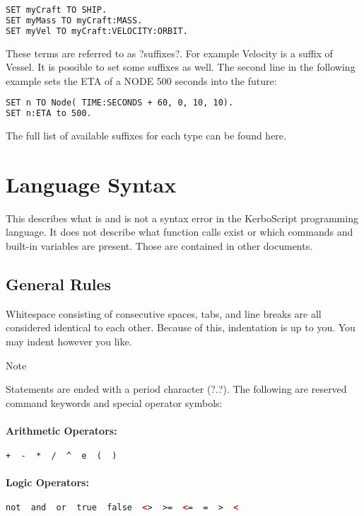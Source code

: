 \begin{lstlisting}[frame=single,language=XML]
SET myCraft TO SHIP.
SET myMass TO myCraft:MASS.
SET myVel TO myCraft:VELOCITY:ORBIT.
\end{lstlisting}

These terms are referred to as ?suffixes?. For example Velocity is a suffix of Vessel. It is possible to set some suffixes as well. The second line in the following example sets the ETA of a NODE 500 seconds into the future:

\begin{lstlisting}[frame=single,language=XML]
SET n TO Node( TIME:SECONDS + 60, 0, 10, 10).
SET n:ETA to 500.
\end{lstlisting}

The full list of available suffixes for each type can be found here.
	\section{Language Syntax}%
	This describes what is and is not a syntax error in the KerboScript programming language. It does not describe what function calls exist or which commands and built-in variables are present. Those are contained in other documents.
	\subsection{General Rules}
Whitespace consisting of consecutive spaces, tabs, and line breaks are all considered identical to each other. Because of this, indentation is up to you. You may indent however you like.

Note

Statements are ended with a period character (?.?).
The following are reserved command keywords and special operator symbols:

\paragraph{Arithmetic Operators:}

\begin{lstlisting}[frame=single,language=XML]
+  -  *  /  ^  e  (  )
\end{lstlisting}

\paragraph{Logic Operators:}

\begin{lstlisting}[frame=single,language=XML]
not  and  or  true  false  <>  >=  <=  =  >  <
\end{lstlisting}

